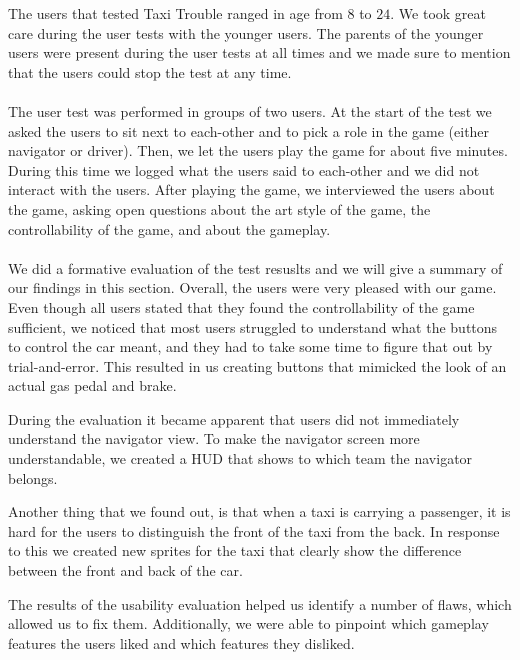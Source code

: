 The users that tested Taxi Trouble ranged in age from $8$ to $24$. We took great care during the user tests with the younger users. The parents of the younger users were present during the user tests at all times and we made sure to mention that the users could stop the test at any time.
\\\\
The user test was performed in groups of two users. At the start of the test we asked the users to sit next to each-other and to pick a role in the game (either navigator or driver). Then, we let the users play the game for about five minutes. During this time we logged what the users said to each-other and we did not interact with the users. After playing the game, we interviewed the users about the game, asking open questions about the art style of the game, the controllability of the game, and about the gameplay.
\\\\
We did a formative evaluation of the test resuslts and we will give a summary of our findings in this section. Overall, the users were very pleased with our game. Even though all users stated that they found the controllability of the game sufficient, we noticed that most users struggled to understand what the buttons to control the car meant, and they had to take some time to figure that out by trial-and-error. This resulted in us creating buttons that mimicked the look of an actual gas pedal and brake.

During the evaluation it became apparent that users did not immediately understand the navigator view. To make the navigator screen more understandable, we created a HUD that shows to which team the navigator belongs.

Another thing that we found out, is that when a taxi is carrying a passenger, it is hard for the users to distinguish the front of the taxi from the back. In response to this we created new sprites for the taxi that clearly show the difference between the front and back of the car.

The results of the usability evaluation helped us identify a number of flaws, which allowed us to fix them. Additionally, we were able to pinpoint which gameplay features the users liked and which features they disliked.